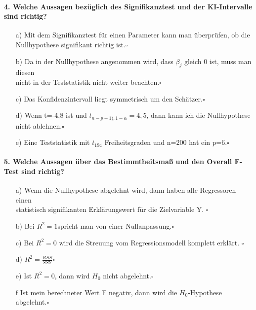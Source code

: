 \documentclass[a4paper]{article}
\begin{document}
\paragraph{4. Welche Aussagen bezüglich des Signifikanztest und der KI-Intervalle sind richtig?}
\begin{itemize}
    \item[a)]Mit dem Signifikanztest für einen Parameter kann man überprüfen, ob die\\ Nullhypothese signifikant richtig ist.\hfill $\square$
    \item[b)]Da in der Nullhypothese angenommen wird, dass $\beta_j$ gleich 0 ist, muss man diesen\\ nicht in der Teststatistik nicht weiter beachten.\hfill $\square$
    \item[c)]Das Konfidenzintervall liegt symmetrisch um den Schätzer.\hfill $\square$
    \item[d)]Wenn t=-4,8 ist und $t_{n-p-1),1-\alpha}=4,5$, dann kann ich die Nullhypothese nicht ablehnen.\hfill $\square$
    \item[e)]Eine Teststatistik mit $t_{194}$ Freiheitsgraden und n=200 hat ein p=6.\hfill $\square$
\end{itemize}

\paragraph{5. Welche Aussagen über das Bestimmtheitsmaß und den Overall F-Test sind richtig?}
\begin{itemize}
    \item[a)]Wenn die Nullhypothese abgelehnt wird, dann haben alle Regressoren einen\\ statistisch signifikanten Erklärungswert für die Zielvariable Y.  \hfill $\square$
    \item[b)]Bei $R^2=1$spricht man von einer Nullanpassung.\hfill $\square$
    \item[c)]Bei $R^2=0$ wird die Streuung vom Regressionsmodell komplett erklärt. \hfill $\square$
    \item[d)]$R^2=\frac{RSS}{SSY}$\hfill $\square$
    \item[e)]Ist $R^2=0$, dann wird $H_0$ nicht abgelehnt.\hfill $\square$
    \item[f]Ist mein berechneter Wert F negativ, dann wird die $H_0$-Hypothese abgelehnt.\hfill $\square$
\end{itemize}


\clearpage
\end{document}
